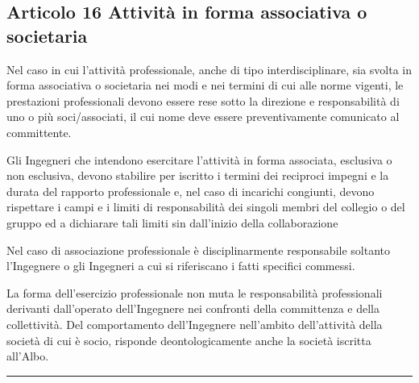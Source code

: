 \documentclass[letterpaper,10pt,italian]{sphinxmanual}
\begin{document}
\subsection{Articolo 16 \sphinxhyphen{} Attività in forma associativa o societaria}
\label{\detokenize{capitoli/codice/codice_deontologico:articolo-16-attivita-in-forma-associativa-o-societaria}}\begin{description}
\sphinxAtStartPar
Nel caso in cui l’attività professionale, anche di tipo interdisciplinare, sia svolta in forma associativa o societaria nei modi e nei termini di cui alle norme vigenti, le prestazioni professionali devono essere rese sotto la direzione e responsabilità di uno o più soci/associati, il cui nome deve essere preventivamente comunicato al committente.

\sphinxAtStartPar
Gli Ingegneri che intendono esercitare l’attività in forma associata, esclusiva o non esclusiva, devono stabilire per iscritto i termini dei reciproci impegni e la durata del rapporto professionale e, nel caso di incarichi congiunti, devono rispettare i campi e i limiti di responsabilità dei singoli membri del collegio o del gruppo ed a dichiarare tali limiti sin dall’inizio della collaborazione

\sphinxAtStartPar
Nel caso di associazione professionale è disciplinarmente responsabile soltanto l’Ingegnere o gli Ingegneri a cui si riferiscano i fatti specifici commessi.

\sphinxAtStartPar
La forma dell’esercizio professionale non muta le responsabilità professionali derivanti dall’operato dell’Ingegnere nei confronti della committenza e della collettività. Del comportamento dell’Ingegnere nell’ambito dell’attività della società di cui è socio, risponde deontologicamente anche la società iscritta all’Albo.

\end{description}


\bigskip\hrule\bigskip



\section{}
\label{\detokenize{capitoli/codice/codice_deontologico:capo-iv-rapporti-esterni}}
\end{document}
